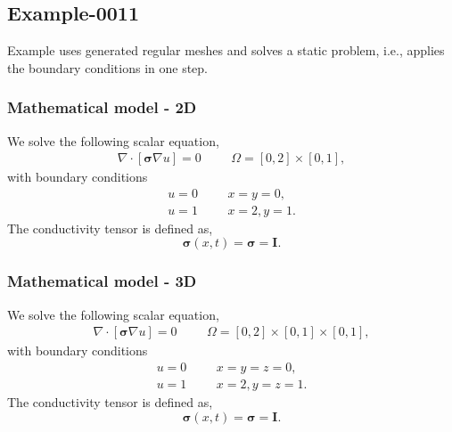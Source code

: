 %
\clearpage
%
\subsection{Example-0011}
%
Example uses generated regular meshes and solves a static problem, i.e., applies
the boundary conditions in one step.
%
%
\subsubsection{Mathematical model - 2D}
%
We solve the following scalar equation,
%
\begin{align}
    \nabla \cdot [\boldsymbol{\sigma} \nabla u] = 0 & &&\Omega = [0, 2] \times [0, 1],
\end{align}
%
with boundary conditions
%
\begin{align}
    u = 0 & &&x = y = 0, \\
    u = 1 & &&x = 2, y = 1.
\end{align}
%
The conductivity tensor is defined as,
%
\begin{equation}
    \boldsymbol{\sigma} (x, t) = \boldsymbol{\sigma} = \boldsymbol{I}.
\end{equation}
%
%
\subsubsection{Mathematical model - 3D}
%
We solve the following scalar equation,
%
\begin{align}
    \nabla \cdot [\boldsymbol{\sigma} \nabla u] = 0 & &&\Omega = [0, 2] \times [0, 1] \times [0, 1],
\end{align}
%
with boundary conditions
%
\begin{align}
    u = 0 & &&x = y = z = 0, \\
    u = 1 & &&x = 2, y = z = 1.
\end{align}
%
The conductivity tensor is defined as,
%
\begin{equation}
    \boldsymbol{\sigma} (x, t) = \boldsymbol{\sigma} = \boldsymbol{I}.
\end{equation}
%
%
